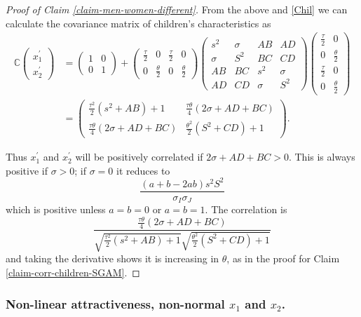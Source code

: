 \documentclass[
  12pt,
]{article}
\theoremstyle{definition}
\theoremstyle{definition}
\theoremstyle{definition}
\theoremstyle{definition}
\theoremstyle{remark}
\begin{document}
\begin{proof}[Proof of Claim \ref{claim-men-women-different}]
From the above and \eqref{Chil} we can calculate the
covariance matrix of children's characteristics as
\begin{align*}
\mathbb{C}\left(\begin{array}{c}
x_{1}^{\prime}\\
x_{2}^{\prime}
\end{array}\right) & =\left(\begin{array}{cc}
1 & 0\\
0 & 1
\end{array}\right)+\left(\begin{array}{cccc}
\frac{\tau}{2} & 0 & \frac{\tau}{2} & 0\\
0 & \frac{\theta}{2} & 0 & \frac{\theta}{2}
\end{array}\right)\left(\begin{array}{cccc}
s^{2} & \sigma & AB & AD\\
\sigma & S^{2} & BC & CD\\
AB & BC & s^{2} & \sigma\\
AD & CD & \sigma & S^{2}
\end{array}\right)\left(\begin{array}{cc}
\frac{\tau}{2} & 0\\
0 & \frac{\theta}{2}\\
\frac{\tau}{2} & 0\\
0 & \frac{\theta}{2}
\end{array}\right)\\
 & =\left(\begin{array}{cc}
\frac{\tau^{2}}{2}(s^{2}+AB)+1 & \frac{\tau\theta}{4}(2\sigma+AD+BC)\\
\frac{\tau\theta}{4}(2\sigma+AD+BC) & \frac{\theta^{2}}{2}(S^{2}+CD)+1
\end{array}\right).
\end{align*}

Thus $x_{1}^{\prime}$ and $x_{2}^{\prime}$ will be positively correlated
if $2\sigma+AD+BC>0$. This is always positive if $\sigma>0$; if $\sigma=0$ 
it reduces to
\[
\frac{(a+b-2ab)s^{2}S^{2}}{\sigma_{I}\sigma_{J}}
\]
which is positive unless $a=b=0$ or $a=b=1$. The correlation is
\[
\frac{
\frac{\tau\theta}{4}(2\sigma+AD+BC)
}{
\sqrt{\frac{\tau^{2}}{2}(s^{2}+AB)+1}
\sqrt{\frac{\theta^{2}}{2}(S^{2}+CD)+1}
}
\]
and taking the derivative shows it is increasing in $\theta$, as in the proof 
for Claim \ref{claim-corr-children-SGAM}.
\end{proof}

\subsubsection{\texorpdfstring{Non-linear attractiveness, non-normal \(x_1\) and \(x_2\).}{Non-linear attractiveness, non-normal x\_1 and x\_2.}}\label{non-linear-attractiveness-non-normal-x_1-and-x_2.}
\end{document}
